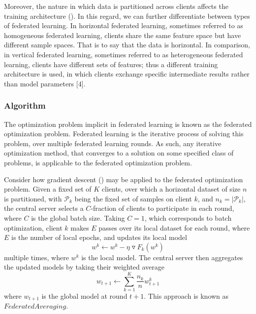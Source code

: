 \documentclass[letterpaper]{article} %
\begin{document}
Moreover, the nature in which data is partitioned across clients affects the training architecture (). In this regard, we can further differentiate between types of federated learning. In horizontal federated learning, sometimes referred to as homogeneous federated learning, clients share the same feature space but have different sample spaces. That is to say that the data is horizontal. In comparison, in vertical federated learning, sometimes referred to as heterogeneous federated learning, clients have different sets of features; thus a different training architecture is used, in which clients exchange specific intermediate results rather than model parameters [4].

\subsubsection{Algorithm}

The optimization problem implicit in federated learning is known as the federated optimization problem. Federated learning is the iterative process of solving this problem, over multiple federated learning rounds. As such, any iterative optimization method, that converges to a solution on some specified class of problems, is applicable to the federated optimization problem. 

Consider how gradient descent () may be applied to the federated optimization problem. Given a fixed set of $K$ clients, over which a horizontal dataset of size $n$ is partitioned, with $\mathcal{P}_k$ being the fixed set of samples on client $k$, and $n_k = |\mathcal{P}_k|$, the central server selects a $C$-fraction of clients to participate in each round, where $C$ is the global batch size. Taking $C=1$, which corresponds to batch optimization, client $k$ makes $E$ passes over its local dataset for each round, where $E$ is the number of local epochs, and updates its local model
\begin{equation}
w^k \leftarrow w^k - \eta \triangledown F_k(w^k)
\end{equation}
multiple times, where $w^k$ is the local model. The central server then aggregates the updated models by taking their weighted average
\begin{equation}
w_{t+1}   \leftarrow \sum_{k=1}^K \frac{n_k}{n} w_{t+1}^k
\end{equation}
where $w_{t+1}$ is the global model at round $t+1$. This approach is known as $Federated Averaging$.
\end{document}
